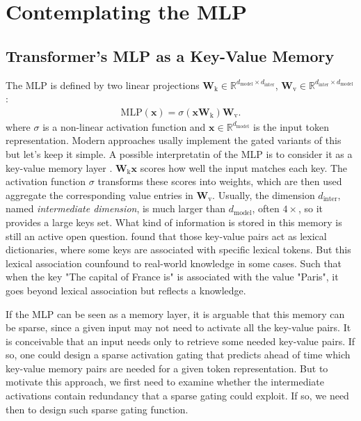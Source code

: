 \documentclass{article} %
\begin{document}
\section{Contemplating the MLP}
\subsection{Transformer's MLP as a Key-Value Memory}
The MLP is defined by two linear
projections $\textbf{W}_{\text{k}} \in \mathbb{R}^{d_{\text{model}} \times d_{\text{inter}}}$, $\textbf{W}_{\text{v}} \in \mathbb{R}^{d_{\text{inter}} \times d_{\text{model}}}$:
\begin{align}
    \text{MLP}(\mathbf{x}) = \sigma(\mathbf{x} \textbf{W}_{\text{k}}) \textbf{W}_{\text{v}}.
\end{align}
where $\sigma$ is a non-linear activation function and $\mathbf{x} \in \mathbb{R}^{d_{\text{model}}}$ is the input token representation.
Modern approaches usally implement the gated variants of this but let's keep it simple.
A possible interpretatin of the MLP is to consider it as a key-value memory layer 
\citep{geva-etal-2021-transformer,dai2022knowledgeneuronspretrainedtransformers,meng2023locatingeditingfactualassociations}.
$\textbf{W}_{\text{k}} \mathbf{x}$ scores how well the input matches each key. 
The activation function \(\sigma\) transforms these scores into weights, 
which are then used aggregate the corresponding value entries in \(\mathbf{W}_{\mathrm{v}}\).
Usually, the dimension $d_{\text{inter}}$, named \textit{intermediate dimension},
is much larger than $d_{\text{model}}$, often $4\times$, so it provides a large keys set.
What kind of information is stored in this memory is still an active open question. 
\citep{geva-etal-2021-transformer} found that those key-value pairs act as lexical dictionaries, 
where some keys are associated with specific lexical tokens.
But this lexical association counfound to real-world knowledge in some cases.
Such that when the key "The capital of France is" is associated with the value "Paris", 
it goes beyond lexical association but reflects a knowledge.

If the MLP can be seen as a memory layer, it is arguable that this memory can be sparse,
since a given input may not need to activate all the key-value pairs.
It is conceivable that an input needs only to retrieve some needed key-value pairs.
If so, one could design a sparse activation gating that predicts ahead of time
which key-value memory pairs are needed for a given token representation.
But to motivate this approach, we first need to examine whether the intermediate activations contain redundancy
that a sparse gating could exploit. If so, we need then to design such sparse gating function.
\end{document}
